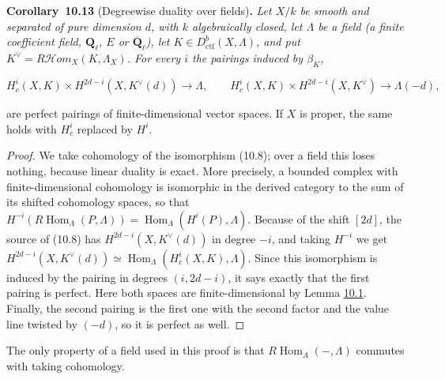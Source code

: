\documentclass[11pt]{article}
\newenvironment{bpstatement}[2]{\par\addvspace{0.6\baselineskip}\noindent\textbf{#1}#2\textbf{.}\enspace\ignorespaces}
  {\par\addvspace{0.4\baselineskip}}
\newenvironment{bpstatementit}[2]{\begin{bpstatement}{#1}{#2}\itshape\ignorespaces}{\end{bpstatement}}
\providecommand{\Hom}{}\renewcommand{\Hom}{\operatorname{Hom}}
\providecommand{\cHom}{}\renewcommand{\cHom}{R\mathcal{H}\!om}
\begin{document}
\label{bp140}%
\begin{bpstatementit}{Corollary~10.13}{ (Degreewise duality over fields)}
Let \(X/k\) be smooth and separated of pure dimension \(d\), with \(k\) algebraically closed, let \(\Lambda\) be a field (a finite coefficient field, \(\mathbf Q_\ell\), \(E\) or \(\overline{\mathbf Q}_\ell\)), let \(K\in D^b_{\mathrm{ctf}}(X,\Lambda)\), and put \(K^\vee=\cHom_X(K,\Lambda_X)\). For every \(i\) the pairings induced by \(\beta_K\),

\[
H_c^i(X,K)\times H^{2d-i}(X,K^\vee(d))\longrightarrow\Lambda,
\qquad
H_c^i(X,K)\times H^{2d-i}(X,K^\vee)\longrightarrow\Lambda(-d),
\]

are perfect pairings of finite-dimensional vector spaces. If \(X\) is proper, the same holds with \(H_c^i\) replaced by \(H^i\).
\end{bpstatementit}

\begin{proof}[{Proof}]\label{bp141}%
We take cohomology of the isomorphism (10.8); over a field this loses nothing, because linear duality is exact. More precisely, a bounded complex with finite-dimensional cohomology is isomorphic in the derived category to the sum of its shifted cohomology spaces, so that \(H^{-i}(R\!\operatorname{Hom}_\Lambda(P,\Lambda))=\Hom_\Lambda(H^i(P),
\Lambda)\). Because of the shift \([2d]\), the source of (10.8) has \(H^{2d-i}(X,K^\vee(d))\) in degree \(-i\), and taking \(H^{-i}\) we get \(H^{2d-i}(X,K^\vee(d))\simeq\Hom_\Lambda(H^i_c(X,K),\Lambda)\). Since this isomorphism is induced by the pairing in degrees \((i,2d-i)\), it says exactly that the first pairing is perfect. Here both spaces are finite-dimensional by Lemma \hyperref[bp105]{10.1}. Finally, the second pairing is the first one with the second factor and the value line twisted by \((-d)\), so it is perfect as well.
\end{proof}

\label{bp142}%
The only property of a field used in this proof is that \(R\!\operatorname{Hom}_\Lambda(-,\Lambda)\) commutes with taking cohomology.
\end{document}

